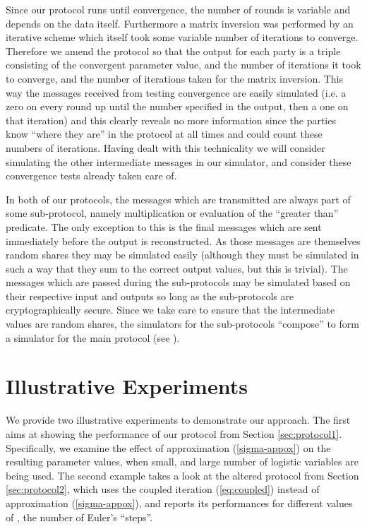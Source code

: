 \documentclass[11pt]{article}
\begin{document}
Since our protocol runs until convergence, the number of rounds is variable and depends on the data itself.  Furthermore a matrix inversion was performed by an iterative scheme which itself took some variable number of iterations to converge.  Therefore we amend the protocol so that the output for each party is a triple consisting of the convergent parameter value, and the number of iterations it took to converge, and the number of iterations taken for the matrix inversion.  This way the messages received from testing convergence are easily simulated (i.e. a zero on every round up until the number specified in the output, then a one on that iteration) and this clearly reveals no more information since the parties know ``where they are'' in the protocol at all times and  could count these numbers of iterations.  Having dealt with this technicality we will consider simulating the other intermediate messages in our simulator, and consider these convergence tests already taken care of.

In both of our protocols, the messages which are transmitted are always part of some sub-protocol, namely multiplication or evaluation of the ``greater than'' predicate.  The only exception to this is the final messages which are sent immediately before the output is reconstructed.  As those messages are themselves random shares they may be simulated easily (although they must be simulated in such a way that they sum to the correct output values, but this is trivial).  The messages which are passed during the sub-protocols may be simulated based on their respective input and outputs so long as the sub-protocols are cryptographically secure.  Since we take care to ensure that the intermediate values are random shares, the simulators for the sub-protocols ``compose'' to form a simulator for the main protocol (see \cite{goldreich}).

\section{Illustrative Experiments}\label{sec:experiment}

We provide two illustrative experiments to demonstrate our approach. The first aims at  showing the performance of our protocol from Section \ref{sec:protocol1}. Specifically, we examine the effect of  approximation (\ref{sigma-appox}) on the resulting parameter values, when small, and large number of logistic variables  are being used. The second example takes a look at the altered protocol from Section \ref{sec:protocol2}, which uses the coupled iteration (\ref{eq:coupled}) instead of approximation (\ref{sigma-appox}), and reports its performances for different values of , the number of Euler's ``steps''.
\end{document}
